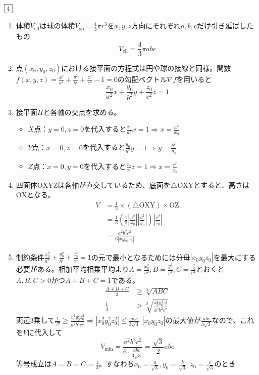 \documentclass[dvipdfmx]{jsreport}
\newcounter{num}[section]
\begin{document}
\begin{answer} %
	$\fbox{4}$
\begin{enumerate}
	\item 体積$V_\mathrm{ell}$は球の体積$V_\mathrm{sp}= \frac{4}{3}\pi r^3$を$x, y, z$方向にそれぞれ$a, b, c$だけ引き延ばしたもの
\begin{equation*}
	V_\mathrm{ell}= \frac{4}{3}\pi abc
\end{equation*}

	\item 点$(x_0, y_0, z_0)$における接平面の方程式は円や球の接線と同様。関数$f(x, y, z)= \frac{x^2}{a^2}+ \frac{y^2}{b^2}+ \frac{z^2}{c^2}-1= 0$の勾配ベクトル$\nabla f$を用いると
\begin{equation*}
	\frac{x_0}{a^2}x+ \frac{y_0}{b^2}y+ \frac{z_0}{c^2}z= 1
\end{equation*}

	\item 接平面$H$と各軸の交点を求める。
\begin{itemize}
	\item $X$点：$y= 0, z= 0$を代入すると$\frac{x_0}{a^2}x= 1\Rightarrow x= \frac{a^2}{x_0}$
	\item $Y$点：$x= 0, z= 0$を代入すると$\frac{y_0}{b^2}y= 1\Rightarrow y= \frac{b^2}{y_0}$
	\item $Z$点：$x= 0, y= 0$を代入すると$\frac{z_0}{c^2}z= 1\Rightarrow x= \frac{c^2}{z_0}$
\end{itemize}

	\item 四面体$\mathrm{OXYZ}$は各軸が直交しているため、底面を$\triangle\mathrm{OXY}$とすると、高さは$\mathrm{OX}$となる。
\begin{align*}
	V
	&= \frac{1}{3}\times (\triangle\mathrm{OXY})\times \mathrm{OZ}\\
	&= \frac{1}{3}\left(\frac{1}{2}\left|\frac{a^2}{x_0}\right|\left|\frac{b^2}{y_0}\right|\right)\left|\frac{c^2}{z_0}\right|\\
	&= \frac{a^2b^2c^2}{6|x_0y_0z_0|}
\end{align*}

	\item 制約条件$\frac{x_0^2}{a^2}+ \frac{y_0^2}{b^2}+ \frac{z_0^2}{c^2}= 1$の元で最小となるためには分母$|x_0y_0z_0|$を最大にする必要がある。相加平均相乗平均より$A= \frac{x_0^2}{a^2}, B= \frac{y_0^2}{b^2}, C= \frac{z_0^2}{c^2}$とおくと$A, B, C> 0$かつ$A+ B+ C= 1$である。
\begin{align*}
	\frac{A+ B+ C}{3}&\ge \sqrt[3]{ABC}\\
	\frac{1}{3}&\ge \sqrt[3]{\frac{x_0^2y_0^2z_0^2}{a^2b^2c^2}}
\end{align*}
	両辺3乗して$\frac{1}{27}\ge \frac{x_0^2y_0^2z_0^2}{a^2b^2c^2}\Rightarrow |x_0^2y_0^2z_0^2|\le \frac{abc}{3\sqrt{3}}$
	$|x_0y_0z_0|$の最大値が$\frac{abc}{3\sqrt{3}}$なので、これを$V$に代入して
\begin{equation*}
	V_\mathrm{min}= \frac{a^2b^2c^2}{6\cdot \frac{abc}{3\sqrt{3}}}= \frac{\sqrt{3}}{2}abc
\end{equation*}
	等号成立は$A= B= C= \frac{1}{3}$。すなわち$x_0= \frac{a}{\sqrt{3}}, y_0= \frac{b}{\sqrt{3}}, z_0= \frac{c}{\sqrt{3}}$のとき


\end{enumerate}
\end{answer}
\end{document}
